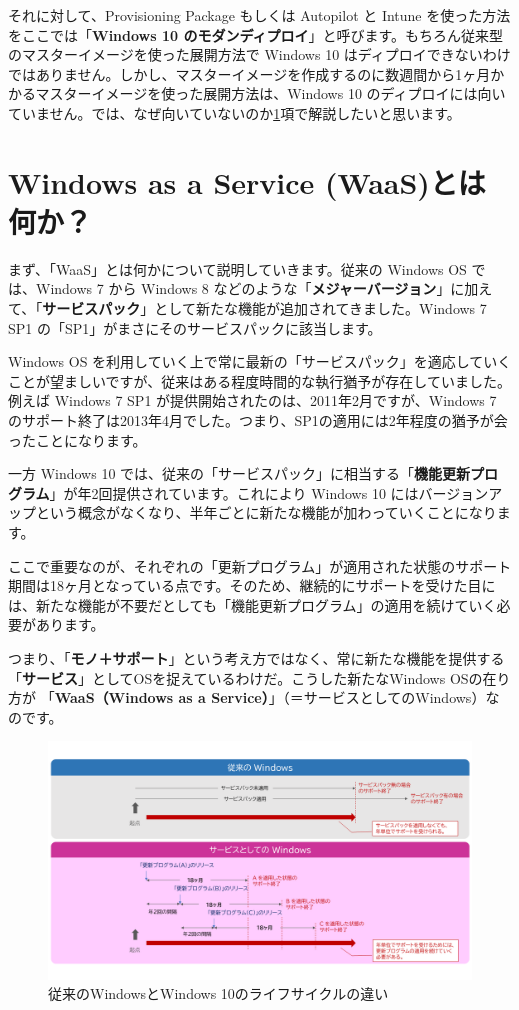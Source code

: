 それに対して、Provisioning Package もしくは Autopilot と Intune を使った方法をここでは「\textbf{Windows 10 のモダンディプロイ}」と呼びます。もちろん従来型のマスターイメージを使った展開方法で Windows 10 はディプロイできないわけではありません。しかし、マスターイメージを作成するのに数週間から1ヶ月かかるマスターイメージを使った展開方法は、Windows 10 のディプロイには向いていません。では、なぜ向いていないのか\ref{sec:WaaS}項で解説したいと思います。

\section{Windows as a Service (WaaS)とは何か？}
\label{sec:WaaS}

まず、「WaaS」とは何かについて説明していきます。従来の Windows OS では、Windows 7 から Windows 8 などのような「\textbf{メジャーバージョン}」に加えて、「\textbf{サービスパック}」として新たな機能が追加されてきました。Windows 7 SP1 の「SP1」がまさにそのサービスパックに該当します。

Windows OS を利用していく上で常に最新の「サービスパック」を適応していくことが望ましいですが、従来はある程度時間的な執行猶予が存在していました。例えば Windows 7 SP1 が提供開始されたのは、2011年2月ですが、Windows 7 のサポート終了は2013年4月でした。つまり、SP1の適用には2年程度の猶予が会ったことになります。

一方 Windows 10 では、従来の「サービスパック」に相当する「\textbf{機能更新プログラム}」が年2回提供されています。これにより Windows 10 にはバージョンアップという概念がなくなり、半年ごとに新たな機能が加わっていくことになります。

ここで重要なのが、それぞれの「更新プログラム」が適用された状態のサポート期間は18ヶ月となっている点です。そのため、継続的にサポートを受けた目には、新たな機能が不要だとしても「機能更新プログラム」の適用を続けていく必要があります。

つまり、「\textbf{モノ＋サポート}」という考え方ではなく、常に新たな機能を提供する「\textbf{サービス}」としてOSを捉えているわけだ。こうした新たなWindows OSの在り方が
「\textbf{WaaS（Windows as a Service）}」（＝サービスとしてのWindows）なのです。

\begin{figure}[htbp]
    \centering
    \includegraphics[width=17cm]{figures/WaaS.png}
    \caption{従来のWindowsとWindows 10のライフサイクルの違い}
    \label{}
\end{figure}

